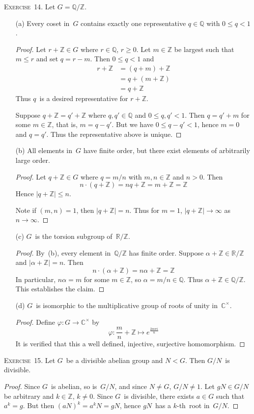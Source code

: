 \documentclass[letterpaper]{article}
\newcommand{\exercise}[1]{\goodbreak\noindent\textsc{Exercise~{#1}.}}
\newcommand{\Z}{\mathbb{Z}}
\newcommand{\Q}{\mathbb{Q}}
\newcommand{\R}{\mathbb{R}}
\newcommand{\C}{\mathbb{C}}
\newcommand{\ord}[1]{|{#1}|}
\begin{document}
\exercise{14}
Let $G=\Q/\Z$.
\begin{enumerate}[itemsep=0pt]
\item[(a)] Every coset in~$G$ contains exactly one representative $q\in\Q$ with $0\le q<1$.
\begin{proof}
Let $r+\Z\in G$ where $r\in\Q$, $r\ge 0$. Let $m\in\Z$ be largest such that $m\le r$ and set $q=r-m$. Then $0\le q<1$ and
\begin{align*}
r+\Z&=(q+m)+\Z\\
	&=q+(m+\Z)\\
	&=q+\Z
\end{align*}
Thus $q$~is a desired representative for $r+\Z$.

Suppose $q+\Z=q'+\Z$ where $q,q'\in\Q$ and $0\le q,q'<1$. Then $q=q'+m$ for some $m\in\Z$, that is, $m=q-q'$. But we have $0\le q-q'<1$, hence $m=0$ and $q=q'$. Thus the representative above is unique. 
\end{proof}
\item[(b)] All elements in~$G$ have finite order, but there exist elements of arbitrarily large order.
\begin{proof}
Let $q+\Z\in G$ where $q=m/n$ with $m,n\in\Z$ and $n>0$. Then
$$n\cdot(q+\Z)=nq+\Z=m+\Z=\Z$$
Hence $\ord{q+\Z}\le n$.

Note if $(m,n)=1$, then $\ord{q+\Z}=n$. Thus for $m=1$, $\ord{q+\Z}\to\infty$ as $n\to\infty$.
\end{proof}
\item[(c)] $G$~is the torsion subgroup of~$\R/\Z$.
\begin{proof}
By~(b), every element in~$\Q/\Z$ has finite order. Suppose $\alpha+\Z\in\R/\Z$ and $\ord{\alpha+\Z}=n$. Then
$$n\cdot(\alpha+\Z)=n\alpha+\Z=\Z$$
In particular, $n\alpha=m$ for some $m\in\Z$, so $\alpha=m/n\in\Q$. Thus $\alpha+\Z\in\Q/\Z$. This establishes the claim.
\end{proof}

\item[(d)] $G$~is isomorphic to the multiplicative group of roots of unity in~$\C^{\times}$.
\begin{proof}
Define $\varphi:G\to\C^{\times}$ by
$$\varphi:\frac{m}{n}+\Z\mapsto e^{\frac{2m\pi i}{n}}$$
It is verified that this a well defined, injective, surjective homomorphism.
\end{proof}
\end{enumerate}

\exercise{15}
Let $G$~be a divisible abelian group and $N<G$. Then $G/N$~is divisible.
\begin{proof}
Since $G$~is abelian, so is~$G/N$, and since $N\ne G$, $G/N\ne 1$. Let $gN\in G/N$ be arbitrary and $k\in\Z$, $k\ne0$. Since $G$~is divisible, there exists $a\in G$ such that $a^k=g$. But then $(aN)^k=a^kN=gN$, hence $gN$~has a $k$-th~root in~$G/N$.
\end{proof}
\end{document}
